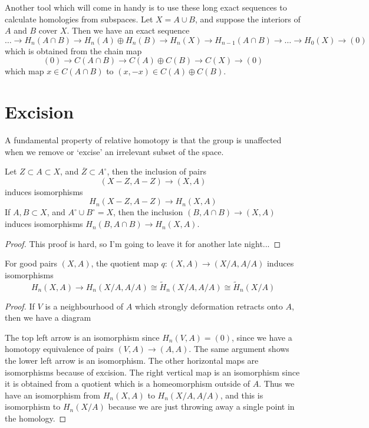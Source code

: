Another tool which will come in handy is to use these long exact sequences to calculate homologies from subspaces. Let $X = A \cup B$, and suppose the interiors of $A$ and $B$ cover $X$. Then we have an exact sequence
%
\[ \dots \to H_n(A \cap B) \to H_n(A) \oplus H_n(B) \to H_n(X) \to H_{n-1}(A \cap B) \to \dots \to H_0(X) \to (0) \]
%
which is obtained from the chain map
%
\[ (0) \to C(A \cap B) \to C(A) \oplus C(B) \to C(X) \to (0) \]
%
which map $x \in C(A \cap B)$ to $(x,-x) \in C(A) \oplus C(B)$.

\section{Excision}

A fundamental property of relative homotopy is that the group is unaffected when we remove or `excise' an irrelevant subset of the space.

\begin{theorem}
    Let $Z \subset A \subset X$, and $\overline{Z} \subset A^\circ$, then the inclusion of pairs
    \[ (X - Z, A - Z) \to (X,A) \]
    induces isomorphisms
    \[  H_n(X - Z, A - Z) \to H_n(X,A) \]
    If $A,B \subset X$, and $A^\circ \cup B^\circ = X$, then the inclusion $(B, A \cap B) \to (X,A)$ induces isomorphisms $H_n(B,A \cap B) \to H_n(X,A)$.
\end{theorem}
\begin{proof}
    This proof is hard, so I'm going to leave it for another late night...
\end{proof}

\begin{theorem}
    For good pairs $(X,A)$, the quotient map $q: (X,A) \to (X/A, A/A)$ induces isomorphisms
    \[ H_n(X,A) \to H_n(X/A,A/A) \cong \tilde{H}_n(X/A,A/A) \cong \tilde{H}_n(X/A) \]
\end{theorem}
\begin{proof}
    If $V$ is a neighbourhood of $A$ which strongly deformation retracts onto $A$, then we have a diagram
    \begin{center}
    \end{center}
    The top left arrow is an isomorphism since $H_n(V,A) = (0)$, since we have a homotopy equivalence of pairs $(V,A) \to (A,A)$. The same argument shows the lower left arrow is an isomorphism. The other horizontal maps are isomorphisms because of excision. The right vertical map is an isomorphism since it is obtained from a quotient which is a homeomorphism outside of $A$. Thus we have an isomorphism from $H_n(X,A)$ to $H_n(X/A,A/A)$, and this is isomorphism to $H_n(X/A)$ because we are just throwing away a single point in the homology.
\end{proof}

